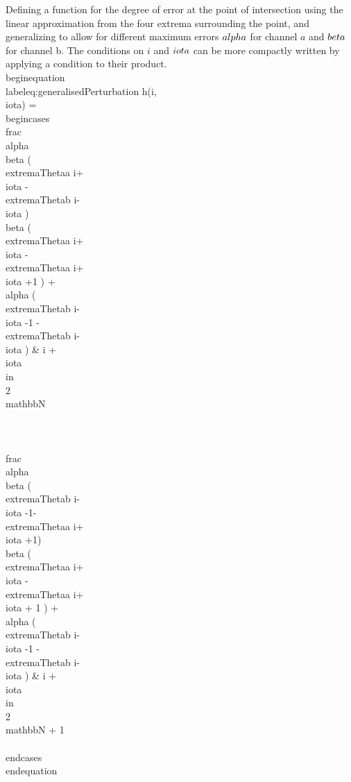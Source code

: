 Defining a function for the degree of error at the point of intersection using the linear approximation from the four extrema surrounding the point, and generalizing to allow for different maximum errors $\\alpha$ for channel $a$ and $\\beta$ for channel b. The conditions on $i$ and $\\iota$ can be more compactly written by applying a condition to their product.
\\begin{equation}\\label{eq:generalisedPerturbation}
h(i,\\iota)  = \\begin{cases}
\\frac{\\alpha  \\beta  (\\extremaTheta{a} {i+\\iota }-\\extremaTheta{b} {i-\\iota })}
{\\beta  (\\extremaTheta{a} {i+\\iota } - \\extremaTheta{a} {i+\\iota +1} ) + \\alpha  (\\extremaTheta{b} {i-\\iota -1} - \\extremaTheta{b} {i-\\iota } ) }  &
  i + \\iota \\in \\{2 \\mathbb{N}     \\}  \\\\
\\frac{\\alpha  \\beta  (\\extremaTheta{b} {i-\\iota -1}-\\extremaTheta{a} {i+\\iota +1})}
{\\beta  ( \\extremaTheta{a} { i+\\iota } -\\extremaTheta{a} { i+\\iota + 1 } ) +\\alpha  ( \\extremaTheta{b} {i-\\iota -1} -\\extremaTheta{b} {i-\\iota } ) }  & 
i + \\iota \\in \\{2 \\mathbb{N}  + 1 \\} 
\\end{cases}
\\end{equation}

